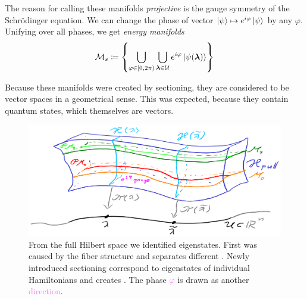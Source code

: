 The reason for calling these manifolds \emph{projective} is the gauge symmetry of the Schr\"odinger equation. We can change the phase of vector $\ket{\psi}\mapsto e^{i\varphi}\ket{\psi}$ by any $\varphi$. Unifying over all phases, we get \emph{energy manifolds}
\begin{equation}
    \mathcal{M}_s\coloneqq \left\{\bigcup_{\varphi\in[0,2\pi)} \bigcup_{{\bm\lambda}\in\mathcal U} e^{i\varphi}\ket{\psi({\bm\lambda})}\right\}
\end{equation}

Because these manifolds were created by sectioning, they are considered to be vector spaces in a geometrical sense. This was expected, because they contain quantum states, which themselves are vectors.

\begin{figure}[H]
    \centering
    \includegraphics[width=\textwidth]{../img/manifold_full_1.png}
\caption{From the full Hilbert space we identified eigenstates. First was caused by the fiber structure and separates different . Newly introduced sectioning correspond to eigenstates of individual Hamiltonians and creates . The phase \textcolor{violet}{$\varphi$} is drawn as another \textcolor{violet}{direction}.}
    \label{fig:fullStructure}
\end{figure}




